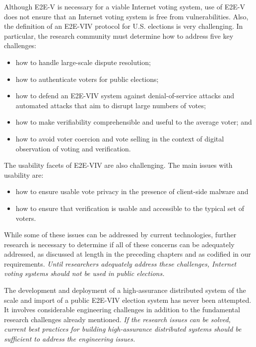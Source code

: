 Although E2E-V is necessary for a viable Internet voting system, use
of E2E-V does not ensure that an Internet voting system is free from
vulnerabilities. Also, the definition of an E2E-VIV protocol for
U.S. elections is very challenging. In particular, the research
community must determine how to address five key challenges:

\begin{itemize}
\item how to handle large-scale dispute resolution;
\item how to authenticate voters for public elections;
\item how to defend an E2E-VIV system against denial-of-service
  attacks and automated attacks that aim to disrupt large numbers of
  votes;
\item how to make verifiability comprehensible and useful to the
  average voter; and
\item how to avoid voter coercion and vote selling in the context of
  digital observation of voting and verification.
\end{itemize}

The usability facets of E2E-VIV are also challenging. The main issues
with usability are:

\begin{itemize}
\item how to ensure usable vote privacy in the presence of client-side
  malware and
\item how to ensure that verification is usable and
  accessible to the typical set of voters.
\end{itemize}

While some of these issues can be addressed by current technologies,
further research is necessary to determine if all of these concerns
can be adequately addressed, as discussed at length in the preceding
chapters and as codified in our requirements. \emph{Until researchers
  adequately address these challenges, Internet voting systems should
  not be used in public elections.}


The development and deployment of a high-assurance distributed system
of the scale and import of a public E2E-VIV election system has never
been attempted. It involves considerable engineering challenges in
addition to the fundamental research challenges already
mentioned. \emph{If the research issues can be solved, current best
practices for building high-assurance distributed systems should be
sufficient to address the engineering issues.}


